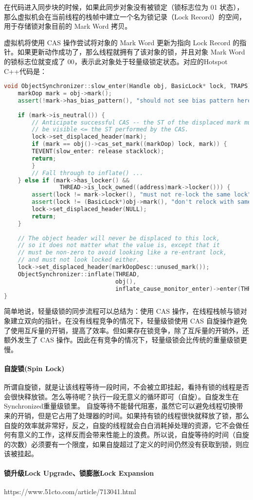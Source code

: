 \documentclass[../../../interview-questions.tex]{subfiles}
\begin{document}
在代码进入同步块的时候，如果此同步对象没有被锁定（锁标志位为 01 状态），那么虚拟机会在当前线程的栈帧中建立一个名为锁记录（Lock Record）的空间，用于存储锁对象目前的 Mark Word 拷贝。

虚拟机将使用 CAS 操作尝试将对象的 Mark Word 更新为指向 Lock Record 的指针。如果更新动作成功了，那么线程就拥有了该对象的锁，并且对象 Mark Word 的锁标志位就变成了 00，表示此对象处于轻量级锁定状态。对应的Hotspot C++代码是：

\begin{lstlisting}[language=C++]
void ObjectSynchronizer::slow_enter(Handle obj, BasicLock* lock, TRAPS) {
    markOop mark = obj->mark();
    assert(!mark->has_bias_pattern(), "should not see bias pattern here");
    
    if (mark->is_neutral()) {
        // Anticipate successful CAS -- the ST of the displaced mark must
        // be visible <= the ST performed by the CAS.
        lock->set_displaced_header(mark);
        if (mark == obj()->cas_set_mark((markOop) lock, mark)) {
        TEVENT(slow_enter: release stacklock);
        return;
        }
        // Fall through to inflate() ...
    } else if (mark->has_locker() &&
                THREAD->is_lock_owned((address)mark->locker())) {
        assert(lock != mark->locker(), "must not re-lock the same lock");
        assert(lock != (BasicLock*)obj->mark(), "don't relock with same BasicLock");
        lock->set_displaced_header(NULL);
        return;
    }
    
    // The object header will never be displaced to this lock,
    // so it does not matter what the value is, except that it
    // must be non-zero to avoid looking like a re-entrant lock,
    // and must not look locked either.
    lock->set_displaced_header(markOopDesc::unused_mark());
    ObjectSynchronizer::inflate(THREAD,
                                obj(),
                                inflate_cause_monitor_enter)->enter(THREAD);
}
\end{lstlisting}

简单地说，轻量级锁的同步流程可以总结为：使用 CAS 操作，在线程栈帧与锁对象建立双向的指针。在没有线程竞争的情况下，轻量级锁使用 CAS 自旋操作避免了使用互斥量的开销，提高了效率。但如果存在锁竞争，除了互斥量的开销外，还额外发生了 CAS 操作。因此在有竞争的情况下，轻量级锁会比传统的重量级锁更慢。

\paragraph{自旋锁(Spin Lock)}所谓自旋锁，就是让该线程等待一段时间，不会被立即挂起，看持有锁的线程是否会很快释放锁。怎么等待呢？执行一段无意义的循环即可（自旋）。自旋发生在Synchronized重量级锁里。
自旋等待不能替代阻塞，虽然它可以避免线程切换带来的开销，但是它占用了处理器的时间。如果持有锁的线程很快就释放了锁，那么自旋的效率就非常好，反之，自旋的线程就会白白消耗掉处理的资源，它不会做任何有意义的工作，这样反而会带来性能上的浪费。所以说，自旋等待的时间（自旋的次数）必须要有一个限度，如果自旋超过了定义的时间仍然没有获取到锁，则应该被挂起。

\paragraph{锁升级Lock Upgrade、锁膨胀Lock Expansion}

https://www.51cto.com/article/713041.html
\end{document}
